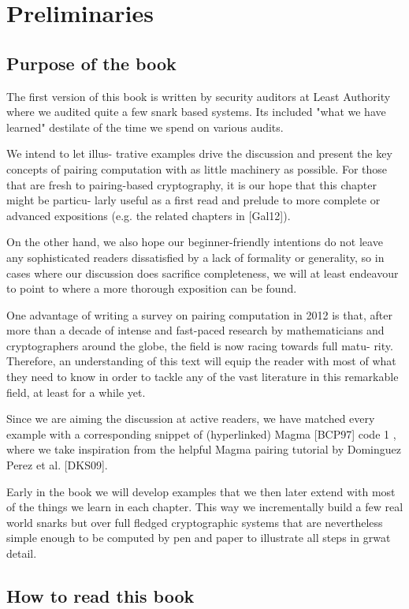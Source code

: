 \chapter{Preliminaries}

\section{Purpose of the book}
The first version of this book is written by security auditors at Least Authority where we audited quite a few snark based systems. Its included "what we have learned" destilate of the time we spend on various audits.  


We intend to let illus-
trative examples drive the discussion and present the key concepts of pairing
computation with as little machinery as possible. For those that are fresh to
pairing-based cryptography, it is our hope that this chapter might be particu-
larly useful as a first read and prelude to more complete or advanced expositions
(e.g. the related chapters in [Gal12]).

On the other hand, we also hope our beginner-friendly intentions do not leave
any sophisticated readers dissatisfied by a lack of formality or generality, so in
cases where our discussion does sacrifice completeness, we will at least endeavour
to point to where a more thorough exposition can be found.

One advantage of writing a survey on pairing computation in 2012 is that,
after more than a decade of intense and fast-paced research by mathematicians
and cryptographers around the globe, the field is now racing towards full matu-
rity. Therefore, an understanding of this text will equip the reader with most
of what they need to know in order to tackle any of the vast literature in this
remarkable field, at least for a while yet.

Since we are aiming the discussion at
active readers, we have matched every example with a corresponding snippet of
(hyperlinked) Magma [BCP97] code 1 , where we take inspiration from the helpful
Magma pairing tutorial by Dominguez Perez et al. [DKS09].

Early in the book we will develop examples that we then later extend with most of the things we learn in each chapter. This way we incrementally build a few real world snarks but over full fledged cryptographic systems that are nevertheless simple enough to be computed by pen and paper to illustrate all steps in grwat detail.


\section{How to read this book}

